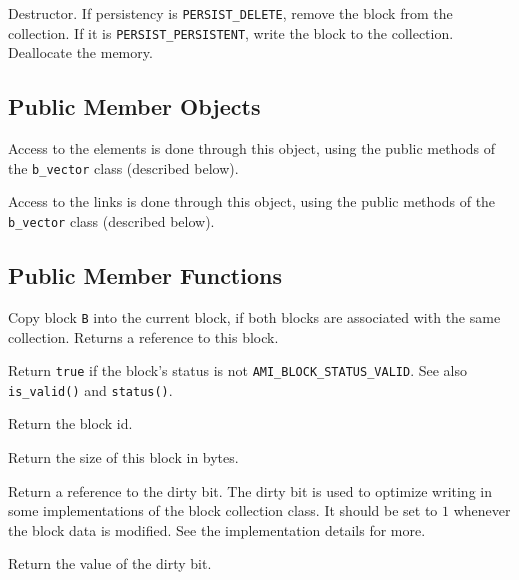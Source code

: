          {Destructor. If persistency 
        is {\tt PERSIST\_DELETE}, remove the block from the collection. 
        If it is {\tt PERSIST\_PERSISTENT}, write the block to the 
        collection. Deallocate the memory.}

   \etabb

\subsection{Public Member Objects}

   \btabb

         {Access to the elements is done through
        this object, using the public methods of the {\tt b\_vector} class
        (described below).}

         {Access to the links is done
        through this object, using the public methods of the {\tt
        b\_vector} class (described below).}

   \etabb

\subsection{Public Member Functions}

   \btabb
        
         {Copy
        block {\tt B} into the current block, if both blocks are associated
        with the same collection. Returns a reference to this block.}

         {Return {\tt true} if the block's status 
        is not {\tt AMI\_BLOCK\_STATUS\_VALID}. See also {\tt is\_valid()} and 
        {\tt status()}.}

         {Return the block id.}

         {Return the size of this block
        in bytes.}

         {Return a reference to the dirty bit. The
        dirty bit is used to optimize writing in some implementations of
        the block collection class. It should be set to $1$ whenever the
        block data is modified. See the implementation details for more.}

         {Return the value of the dirty bit.}

